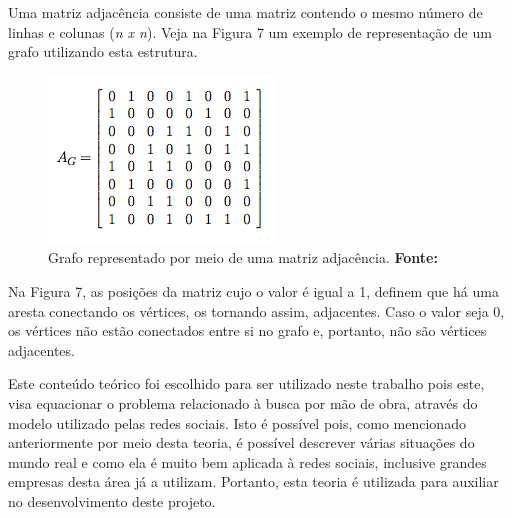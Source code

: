 Uma matriz adjacência consiste de uma matriz contendo o mesmo número de linhas e colunas (\textit{n x n}). Veja na Figura 7 um exemplo de representação de um grafo utilizando esta estrutura.

\begin{figure}[h!]
	\centerline{\includegraphics[scale=0.7]{./imagens/matriz_adjacencia.png}}
	\caption[Grafo representado por meio de uma matriz adjacência]
	{Grafo representado por meio de uma matriz adjacência. \textbf{Fonte:} }
	\label{fig:exemplo1}
\end{figure}

Na Figura 7, as posições da matriz cujo o valor é igual a 1, definem que há uma aresta conectando os vértices, os tornando assim, adjacentes. Caso o valor seja 0, os vértices não estão conectados entre si no grafo e, portanto, não são vértices adjacentes.

\par Este conteúdo teórico foi escolhido para ser utilizado neste trabalho pois este, visa equacionar o problema relacionado à busca por mão de obra, através do modelo utilizado pelas redes sociais. Isto é possível pois, como mencionado anteriormente por meio desta teoria, é possível descrever várias situações do mundo real e como ela é muito bem aplicada à redes sociais, inclusive grandes empresas desta área já a utilizam. Portanto, esta teoria é  utilizada para auxiliar no desenvolvimento deste projeto.
